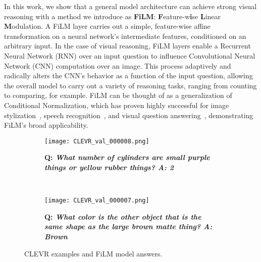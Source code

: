 \documentclass[letterpaper]{article} \usepackage{aaai18}  \usepackage{times}  \usepackage{helvet}  \usepackage{courier}  \usepackage{url}  \usepackage{graphicx}  \frenchspacing  \setlength{\pdfpagewidth}{8.5in}  \setlength{\pdfpageheight}{11in}
\begin{document}
    In this work, we show that a general model architecture can achieve strong visual reasoning with a method we introduce as \textbf{FiLM}: \textbf{F}eature-w\textbf{i}se \textbf{L}inear \textbf{M}odulation. A FiLM layer carries out a simple, feature-wise affine transformation on a neural network's intermediate features, conditioned on an arbitrary input. In the case of visual reasoning, FiLM layers enable a Recurrent Neural Network (RNN) over an input question to influence Convolutional Neural Network (CNN) computation over an image. This process adaptively and radically alters the CNN's behavior as a function of the input question, allowing the overall model to carry out a variety of reasoning tasks, ranging from counting to comparing, for example. FiLM can be thought of as a generalization of Conditional Normalization, which has proven highly successful for image stylization~\cite{CIN,CIN2,AIN}, speech recognition~\cite{DynamicLayerNorm}, and visual question answering~\cite{modulating_vision}, demonstrating FiLM's broad applicability.
    \begin{figure}[t]
	\centering
    \begin{subfigure}[t]{.2\textwidth}
        \centering
        \texttt{[image: CLEVR\_val\_000008.png]}
        \caption{\bf{Q:} \it{What number of cylinders are small purple things or yellow rubber things?
        \bf{A:} \textit{2}}}
    \end{subfigure}
    ~ 
    \begin{subfigure}[t]{.2\textwidth}
		\centering
        \texttt{[image: CLEVR\_val\_000007.png]}
        \caption{\bf{Q:} \it{What color is the other object that is the same shape as the large brown matte thing?
        \bf{A:} \textit{Brown}}}
    \end{subfigure}
    \caption{CLEVR examples and FiLM model answers.}
    \label{fig:CLEVR}
\end{figure}
\end{document}
